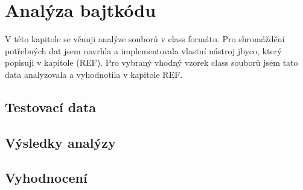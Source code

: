 \chapter{Analýza bajtkódu}


V této kapitole se věnuji analýze souborů v class formátu. Pro shromáždění potřebných dat jsem navrhla a implementovala vlastní nástroj jbyco, který popisuji v kapitole (REF). Pro vybraný vhodný vzorek class souborů jsem tato data analyzovala a vyhodnotila v kapitole REF.

\section{Testovací data}


\section{Výsledky analýzy}


\section{Vyhodnocení}


